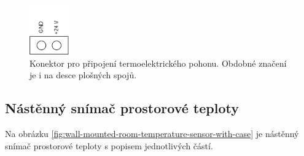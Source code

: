 \begin{Czech}
\begin{figure}[H]
    \centering
    \includegraphics[width=0.15\textwidth]{pictures/all/hardware/zone-controller-terminal-block.png}
    \caption{Konektor pro připojení termoelektrického pohonu. Obdobné značení je i na desce plošných spojů.}
    \label{fig:zone-controller-terminal-block}
\end{figure}
\end{Czech}


\newpage
\begin{Czech}
\subsection{Nástěnný snímač prostorové teploty}
\end{Czech}

\begin{Czech}
Na obrázku \ref{fig:wall-mounted-room-temperature-sensor-with-case} je nástěnný snímač prostorové teploty s popisem jednotlivých částí.
\end{Czech}

